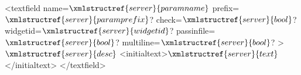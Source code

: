 <textfield name=$\xmlstructref{server}{paramname}$  prefix=$\xmlstructref{server}{paramprefix}$? check=$\xmlstructref{server}{bool}$? widgetid=$\xmlstructref{server}{widgetid}$? 
         passinfile=$\xmlstructref{server}{bool}$? multiline=$\xmlstructref{server}{bool}$? >
  $\xmlstructref{server}{desc}$
  <initialtext>$\xmlstructref{server}{text}$</initialtext>
</textfield>
